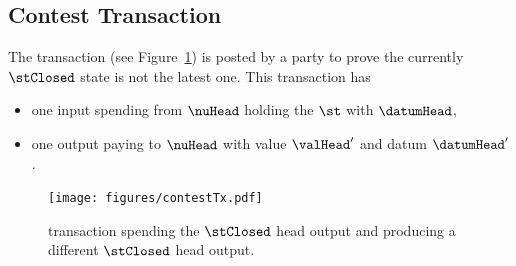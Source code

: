 \subsection{Contest Transaction}\label{sec:contest-tx}

The \mtxContest{} transaction (see Figure~\ref{fig:contestTx}) is posted by a
party to prove the currently $\stClosed$ state is not the latest one. This
transaction has
\begin{itemize}
	\item one input spending from $\nuHead$ holding the $\st$ with $\datumHead$,
	\item one output paying to $\nuHead$ with value $\valHead'$ and
	      datum $\datumHead'$.
\end{itemize}

\begin{figure}[h]
	\centering \texttt{[image: figures/contestTx.pdf]}
	\caption{\mtxContest{} transaction spending the $\stClosed$ head output and
		producing a different $\stClosed$ head output.}\label{fig:contestTx}
\end{figure}

